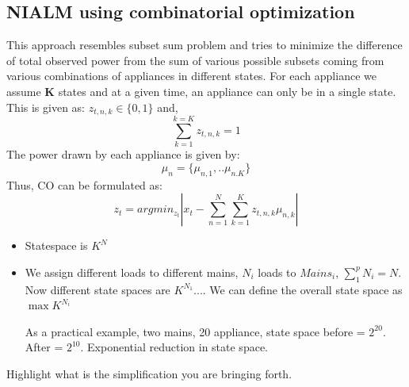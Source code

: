 \documentclass[conference]{IEEEtran}
\begin{document}
\subsection{NIALM using combinatorial optimization}
This approach resembles subset sum problem and tries to minimize the difference of total observed power from the sum of various possible subsets coming from various combinations of appliances in different states. For each appliance we assume \textbf{K} states and at a given time, an appliance can only be in a single state. This is given as: 
$z_{t,n,k}\in\{0,1\} $ and, $$\sum\limits_{k=1}^{k=K} z_{t,n,k}=1$$The power drawn by each appliance is given by:
$$\mu_n=\{\mu_{n,1},..\mu_{n.K}\}$$ Thus, CO can be formulated as:
$$z_t=arg min_{z_t}|x_t-\sum\limits_{n=1}^{N}\sum\limits_{k=1}^{K}z_{t,n,k}\mu_{n,k}|$$

\begin{itemize}
\item Statespace is $K^N$
\item We assign different loads to different mains, $N_i$ loads to $Mains_i$, $\sum\limits_{1}^{p}{N_i}=N$. Now different state spaces are
$K^{N_1}$.... We can define the overall state space as $\max{K^{N_i}}$

As a practical example, two mains, 20 appliance, state space before = $2^{20}$. After = $2^{10}$. Exponential reduction in state space.
\end{itemize}

Highlight what is the simplification you are bringing forth.
\end{document}
